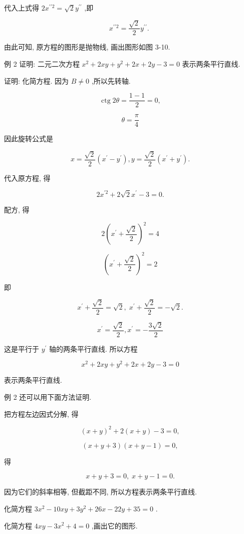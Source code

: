 \documentclass[lang=cn,newtx,10pt,scheme=chinese]{elegantbook}
\begin{document}
代入上式得 \(2{x}^{\prime \prime 2} = \sqrt{2}{y}^{\prime \prime }\) ,即

\[
    {x}^{\prime \prime 2} = \frac{\sqrt{2}}{2}{y}^{\prime \prime }\text{. }
\]

由此可知, 原方程的图形是抛物线, 画出图形如图 3-10.

例 2 证明: 二元二次方程 \({x}^{2} + {2xy} + {y}^{2} + {2x} + {2y} - 3 = 0\) 表示两条平行直线.

证明: 化简方程. 因为 \(B \neq 0\) ,所以先转轴.

\[
  \operatorname{ctg}{2\theta } = \frac{1 - 1}{2} = 0,
\]

\[
  \theta = \frac{\pi }{4}
\]

因此旋转公式是

\[
  x = \frac{\sqrt{2}}{2}\left( {{x}^{\prime } - {y}^{\prime }}\right) ,y = \frac{\sqrt{2}}{2}\left( {{x}^{\prime } + {y}^{\prime }}\right) .
\]

代入原方程, 得

\[
  2{x}^{\prime 2} + 2\sqrt{2}{x}^{\prime } - 3 = 0.
\]

配方, 得

\[
  2{\left( {x}^{\prime } + \frac{\sqrt{2}}{2}\right) }^{2} = 4
\]

\[
    {\left( {x}^{\prime } + \frac{\sqrt{2}}{2}\right) }^{2} = 2
\]

即

\[
    {x}^{\prime } + \frac{\sqrt{2}}{2} = \sqrt{2},\;{x}^{\prime } + \frac{\sqrt{2}}{2} = - \sqrt{2}.
\]

\[
    {x}^{\prime } = \frac{\sqrt{2}}{2},{x}^{\prime } = - \frac{3\sqrt{2}}{2}
\]

这是平行于 \({y}^{\prime }\) 轴的两条平行直线. 所以方程

\[
    {x}^{2} + {2xy} + {y}^{2} + {2x} + {2y} - 3 = 0
\]

表示两条平行直线.

例 2 还可以用下面方法证明.

把方程左边因式分解, 得

\[
    {\left( x + y\right) }^{2} + 2\left( {x + y}\right) - 3 = 0,
\]

\[
  \left( {x + y + 3}\right) \left( {x + y - 1}\right) = 0,
\]

得

\[
  x + y + 3 = 0,\;x + y - 1 = 0.
\]

因为它们的斜率相等, 但截距不同, 所以方程表示两条平行直线.

\begin{problemset}[练习]

\item 化简方程 \(3{x}^{2} - {10xy} + 3{y}^{2} + {26x} - {22y} + {35} = 0\) .

\item 化简方程 \({4xy} - 3{x}^{2} + 4 = 0\) ,画出它的图形.

\end{problemset}
\end{document}
